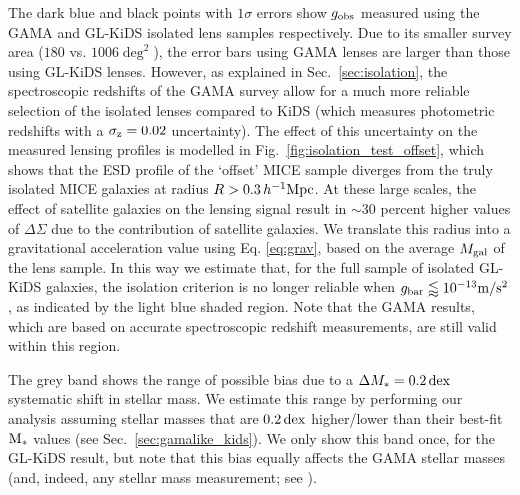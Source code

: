 \documentclass[usenatbib]{mnras}
\newcommand{\hMpc}{\, h^{-1}{\rm{Mpc}} }
\newcommand{\mpss}{ {\rm m/s^2} }
\newcommand{\un}[1]{_{\rm #1}}
\newcommand{\dex}{\, {\rm dex}}
\begin{document}
The dark blue and black points with $1\sigma$ errors show $g\un{obs}$ measured using the GAMA and GL-KiDS isolated lens samples respectively. Due to its smaller survey area ($180$ vs. $1006 \deg^2$), the error bars using GAMA lenses are larger than those using GL-KiDS lenses. However, as explained in Sec.~\ref{sec:isolation}, the spectroscopic redshifts of the GAMA survey allow for a much more reliable selection of the isolated lenses compared to KiDS (which measures photometric redshifts with a $\sigma\un{z}=0.02$ uncertainty). The effect of this uncertainty on the measured lensing profiles is modelled in Fig.~\ref{fig:isolation_test_offset}, which shows that the ESD profile of the `offset' MICE sample diverges from the truly isolated MICE galaxies at radius $R > 0.3 \hMpc$. At these large scales, the effect of satellite galaxies on the lensing signal result in $\sim30$ percent higher values of $\Delta\Sigma$ due to the contribution of satellite galaxies. We translate this radius into a gravitational acceleration value using Eq. \ref{eq:grav}, based on the average $M\un{gal}$ of the lens sample. In this way we estimate that, for the full sample of isolated GL-KiDS galaxies, the isolation criterion is no longer reliable when $g\un{bar} \lessapprox 10^{-13} \mpss$, as indicated by the light blue shaded region. Note that the GAMA results, which are based on accurate spectroscopic redshift measurements, are still valid within this region.

The grey band shows the range of possible bias due to a $\Delta M_*=0.2 \dex$ systematic shift in stellar mass. We estimate this range by performing our analysis assuming stellar masses that are $0.2 \dex$ higher/lower than their best-fit ${\rm M_*}$ values (see Sec.~\ref{sec:gamalike_kids}). We only show this band once, for the GL-KiDS result, but note that this bias equally affects the GAMA stellar masses (and, indeed, any stellar mass measurement; see \citealt{wright2017}).
\end{document}
